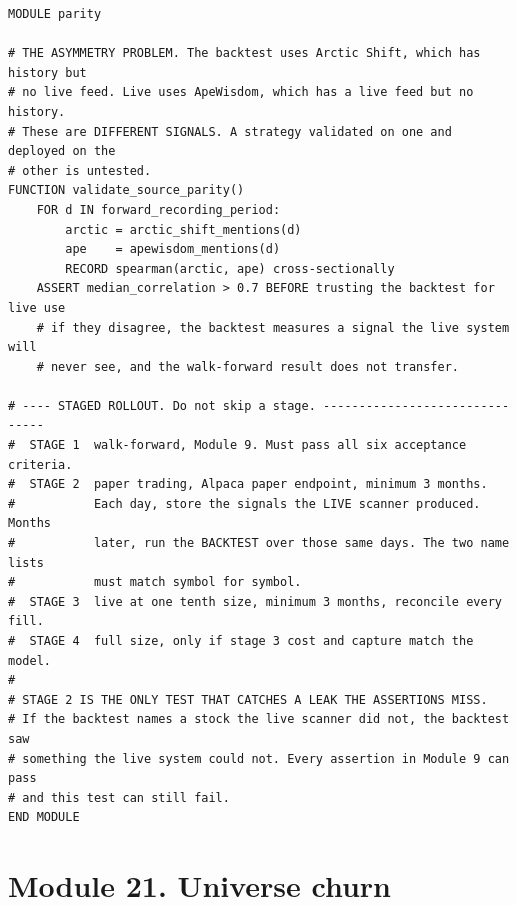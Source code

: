 \documentclass[10pt]{article}
\begin{document}
\begin{lstlisting}
MODULE parity

# THE ASYMMETRY PROBLEM. The backtest uses Arctic Shift, which has history but
# no live feed. Live uses ApeWisdom, which has a live feed but no history.
# These are DIFFERENT SIGNALS. A strategy validated on one and deployed on the
# other is untested.
FUNCTION validate_source_parity()
    FOR d IN forward_recording_period:
        arctic = arctic_shift_mentions(d)
        ape    = apewisdom_mentions(d)
        RECORD spearman(arctic, ape) cross-sectionally
    ASSERT median_correlation > 0.7 BEFORE trusting the backtest for live use
    # if they disagree, the backtest measures a signal the live system will
    # never see, and the walk-forward result does not transfer.

# ---- STAGED ROLLOUT. Do not skip a stage. -------------------------------
#  STAGE 1  walk-forward, Module 9. Must pass all six acceptance criteria.
#  STAGE 2  paper trading, Alpaca paper endpoint, minimum 3 months.
#           Each day, store the signals the LIVE scanner produced. Months
#           later, run the BACKTEST over those same days. The two name lists
#           must match symbol for symbol.
#  STAGE 3  live at one tenth size, minimum 3 months, reconcile every fill.
#  STAGE 4  full size, only if stage 3 cost and capture match the model.
#
# STAGE 2 IS THE ONLY TEST THAT CATCHES A LEAK THE ASSERTIONS MISS.
# If the backtest names a stock the live scanner did not, the backtest saw
# something the live system could not. Every assertion in Module 9 can pass
# and this test can still fail.
END MODULE
\end{lstlisting}

\section{Module 21. Universe churn}
\end{document}

